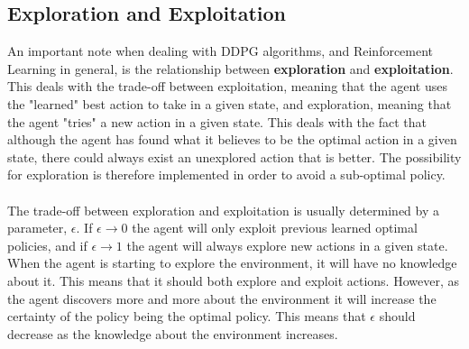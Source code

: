 \subsection{Exploration and Exploitation}
An important note when dealing with DDPG algorithms, and Reinforcement Learning in general, is the relationship between \textbf{exploration} and \textbf{exploitation}. This deals with the trade-off between exploitation, meaning that the agent uses the "learned" best action to take in a given state, and exploration, meaning that the agent "tries" a new action in a given state. This deals with the fact that although the agent has found what it believes to be the optimal action in a given state, there could always exist an unexplored action that is better. The possibility for exploration is therefore implemented in order to avoid a sub-optimal policy.\\\\
The trade-off between exploration and exploitation is usually determined by a parameter, $\epsilon$. If $\epsilon \longrightarrow 0$ the agent will only exploit previous learned optimal policies, and if $\epsilon \longrightarrow 1$ the agent will always explore new actions in a given state. When the agent is starting to explore the environment, it will have no knowledge about it. This means that it should both explore and exploit actions. However, as the agent discovers more and more about the environment it will increase the certainty of the policy being the optimal policy. This means that $\epsilon$ should decrease as the knowledge about the environment increases. 





